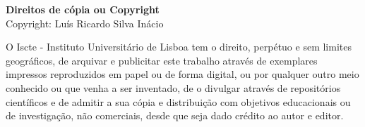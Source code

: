 \newpage
\thispagestyle{empty}
\noindent %
{\footnotesize %
	\textbf{Direitos de cópia ou Copyright} \\ %
	\textcopyright
	Copyright: Luís Ricardo Silva Inácio \\[-0.5cm] %
	\begin{flushleft} %
		\renewcommand{\baselinestretch}{1}\selectfont %
		\justify %
		O Iscte - Instituto Universitário de Lisboa tem o direito, perpétuo e sem limites geográficos, de arquivar e publicitar este trabalho através de exemplares impressos reproduzidos em papel ou de forma digital, ou por qualquer outro meio conhecido ou que venha a ser inventado, de o divulgar através de repositórios científicos e de admitir a sua cópia e distribuição com objetivos educacionais ou de investigação, não comerciais, desde que seja dado crédito ao autor e editor.
	\end{flushleft}
}
\newpage
